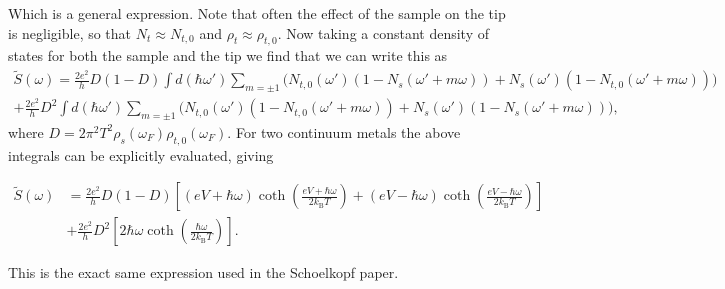 Which is a general expression. Note that often the effect of the sample on the tip is negligible, so that $N_t\approx N_{t,0}$ and $\rho_t\approx\rho_{t,0}$. Now taking a constant density of states for both the sample and the tip we find that we can write this as
\begin{align}
    \tilde{S}(\omega) = \frac{2e^2}{h}D(1-D)\int d(\hbar\omega')\sum_{m=\pm1}\biggl(N_{t,0}(\omega')(1-N_s(\omega'+m\omega))+N_s(\omega')(1-N_{t,0}(\omega'+m\omega))\biggr)\nonumber\\
    +\frac{2e^2}{h}D^2\int d(\hbar\omega')\sum_{m=\pm1}\biggl(N_{t,0}(\omega')(1-N_{t,0}(\omega'+m\omega))+N_s(\omega')(1-N_s(\omega'+m\omega))\biggr),
\end{align}
where $D = 2\pi^2T^2\rho_s(\omega_F)\rho_{t,0}(\omega_F)$. For two continuum metals the above integrals can be explicitly evaluated, giving 
\begin{tcolorbox}[colback=gray!20!white]
\begin{align}
    \tilde{S}(\omega)& = \frac{2e^2}{h}D(1-D)\left[(eV+\hbar\omega)\coth\left(\frac{eV+\hbar\omega}{2k_\mathrm{B}T}\right)+(eV-\hbar\omega)\coth\left(\frac{eV-\hbar\omega}{2k_\mathrm{B}T}\right)\right]\nonumber\\
    &+\frac{2e^2}{h}D^2\left[2\hbar\omega\coth\left(\frac{\hbar\omega}{2k_\mathrm{B}T}\right)\right].
\end{align}
\end{tcolorbox}
This is the exact same expression used in the Schoelkopf paper. 
